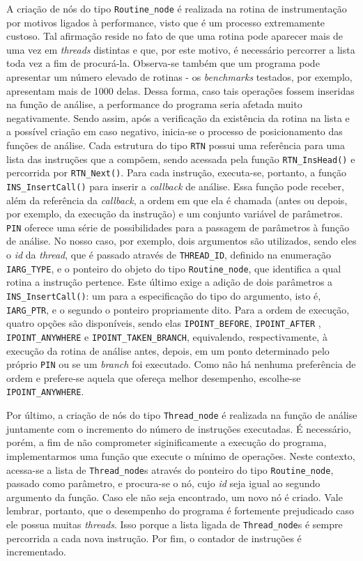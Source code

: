 \documentclass[12pt]{article}
\begin{document}
A criação de nós do tipo \texttt{Routine\_node} é realizada na rotina de
instrumentação por motivos ligados à performance, visto que é um processo
extremamente custoso. Tal afirmação reside no fato de que uma rotina
pode aparecer mais de uma vez em \textit{threads} distintas e que, por este
motivo, é necessário percorrer a lista toda vez a fim de procurá-la. Observa-se
também que um programa pode apresentar um número elevado de rotinas - os
\textit{benchmarks} testados, por exemplo, apresentam mais de 1000 delas. Dessa
forma, caso tais operações fossem inseridas na função de análise, a performance
do programa seria afetada muito negativamente. Sendo assim, após a verificação
da existência da rotina na lista e a possível criação em caso negativo,
inicia-se o processo de posicionamento das funções de análise. Cada estrutura do
tipo \texttt{RTN} possui uma referência para uma lista das instruções que a
compõem, sendo acessada pela função \texttt{RTN\_InsHead()} e percorrida por
\texttt{RTN\_Next()}. Para cada instrução, executa-se, portanto, a função
\texttt{INS\_InsertCall()} para inserir a \textit{callback} de análise. Essa
função pode receber, além da referência da \textit{callback}, a ordem em que
ela é chamada (antes ou depois, por exemplo, da execução da instrução) e um
conjunto variável de parâmetros. \texttt{PIN} oferece uma série de
possibilidades para a passagem de parâmetros à função de análise. No nosso caso,
por exemplo, dois argumentos são utilizados, sendo eles o \textit{id} da
\textit{thread}, que é passado através de \texttt{THREAD\_ID}, definido na
enumeração \texttt{IARG\_TYPE}, e o ponteiro do objeto do tipo
\texttt{Routine\_node}, que identifica a qual rotina a instrução pertence. Este
último exige a adição de dois parâmetros a \texttt{INS\_InsertCall()}: um para a
especificação do tipo do argumento, isto é, \texttt{IARG\_PTR}, e o segundo o
ponteiro propriamente dito. Para a ordem de execução, quatro opções são
disponíveis, sendo elas \texttt{IPOINT\_BEFORE}, \texttt{IPOINT\_AFTER} ,
\texttt{IPOINT\_ANYWHERE} e \texttt{IPOINT\_TAKEN\_BRANCH}, equivalendo,
respectivamente, à execução da rotina de análise antes, depois, em um ponto
determinado pelo próprio \texttt{PIN} ou se um \textit{branch} foi executado.
Como não há nenhuma preferência de ordem e prefere-se aquela que ofereça melhor
desempenho, escolhe-se \texttt{IPOINT\_ANYWHERE}.

Por último, a criação de nós do tipo \texttt{Thread\_node} é realizada na função
de análise juntamente com o incremento do número de instruções executadas. É 
necessário, porém, a fim de não comprometer siginificamente a execução do
programa, implementarmos uma função que execute o mínimo de operações. Neste
contexto, acessa-se a lista de \texttt{Thread\_node}s através do ponteiro do
tipo \texttt{Routine\_node}, passado como parâmetro, e procura-se o nó, cujo
\textit{id} seja igual ao segundo argumento da função. Caso ele não seja
encontrado, um novo nó é criado. Vale lembrar, portanto, que o desempenho do
programa é fortemente prejudicado caso ele possua muitas \textit{threads}. Isso
porque a lista ligada de \texttt{Thread\_node}s é sempre percorrida a cada nova
instrução. Por fim, o contador de instruções é incrementado.
\end{document}
